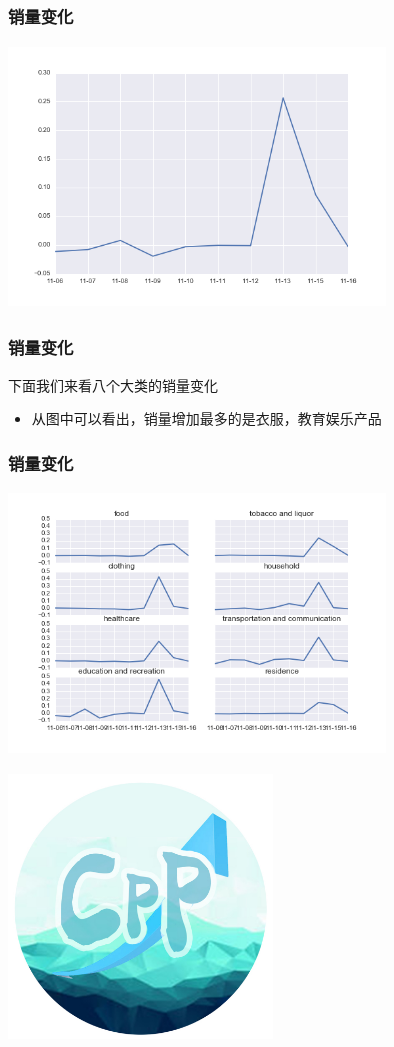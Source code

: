 \documentclass{beamer}
\begin{document}
\begin{frame}
\frametitle{销量变化}
\includegraphics[width=10cm,height=7cm]{double11_data_bigquatity.png}
\end{frame}

\begin{frame}
\frametitle{销量变化}
下面我们来看八个大类的销量变化
\begin{itemize}
  \item 从图中可以看出，销量增加最多的是衣服，教育娱乐产品 
\end{itemize}
\end{frame}

\begin{frame}
\frametitle{销量变化}
\includegraphics[width=10cm,height=7cm]{double11_data_totalquatity.png}
\end{frame}


\begin{frame} 
\begin{center}
  \includegraphics[width=7cm,height=7cm]{CPP.jpg}
\end{center}
\end{frame}
\end{document}
